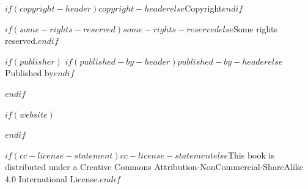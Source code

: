 \pagestyle{empty}

  \begin{center} 

  \sansfont
  
  \makeatletter  \small \@title \par \makeatother
    
    $if(copyright-header)$$copyright-header$$else$Copyright$endif$ \ccLogo\ \makeatletter \@date \ \@author \makeatother \par
    $if(some-rights-reserved)$$some-rights-reserved$$else$Some rights reserved.$endif$ \par
    
    \vspace{0.4cm}

$if(publisher)$
    $if(published-by-header)$$published-by-header$$else$Published by$endif$ \par

    \publisher \par
$endif$
    
$if(website)$
    \website \par
$endif$
    
    \vspace{0.4cm}

    $if(cc-license-statement)$$cc-license-statement$$else$This book is distributed under a Creative Commons Attribution-NonCommercial-ShareAlike 4.0 International License.$endif$ \par

    \vspace{0.4cm}

    \ccbyncsa
    
  \end{center}
       
